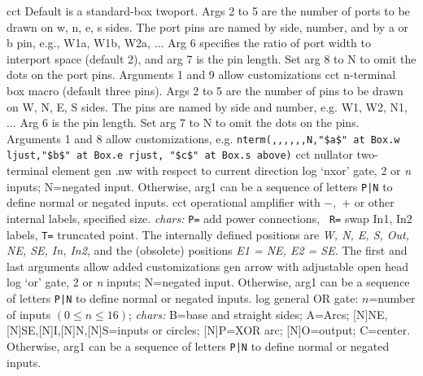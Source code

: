  {cct}
  { Default is a standard-box twoport.  Args 2 to 5 are
    the number of ports to be drawn on w, n, e, s sides.  The port pins
    are named by side, number, and by a or b pin, e.g., W1a, W1b, W2a,
    $\ldots$ Arg 6 specifies the ratio of port width to interport space
    (default 2), and arg 7 is the pin length.  Set arg 8 to N to omit
    the dots on the port pins. Arguments 1 and 9 allow customizations
   }
  {cct}
  {n-terminal box macro (default three pins).
   Args 2 to 5 are the number of pins to be drawn on W, N, E, S
   sides.  The pins are named by side and number, e.g. W1, W2, N1,
   $\ldots$ Arg 6 is the pin length.  Set arg 7 to N to omit the
   dots on the pins. Arguments 1 and 8 allow customizations, e.g.
   {\tt nterm(,{,},{,},{,}N,"\$a\$" at Box.w ljust,"\$b\$" at Box.e rjust,
      "\$c\$" at Box.s above)} }
  {cct}
  { nullator two-terminal element }
  {gen}
  {.nw with respect to current direction}
  {log}
  {`nxor' gate, 2 or {\sl n\/} inputs; N=negated input.
   Otherwise, arg1 can be a sequence of letters {\tt P|N} to define
   normal or negated inputs.
    }
%
  {cct}
  {operational amplifier with $-,$ $+$ or other internal labels,
    specified size. {\sl chars:} {\tt P=} add power connections, {\tt
    R=} swap In1, In2 labels, {\tt T=} truncated point.  The internally
    defined positions are {\sl W, N, E, S, Out, NE, SE, In, In2}, and
    the (obsolete) positions {\sl E1 = NE, E2 = SE}.  The first and last
    arguments allow added customizations
   }
  {gen}
  {arrow with adjustable open head}
  {log}
  {`or' gate, 2 or {\sl n\/} inputs; N=negated input.
   Otherwise, arg1 can be a sequence of letters {\tt P|N} to define
   normal or negated inputs.
    }
  {log}
  {general OR gate: $n$=number of inputs $(0\leq n\leq 16)$;
    {\sl chars:} B=base and straight sides; A=Arcs;
           [N]NE,[N]SE,[N]I,[N]N,[N]S=inputs or circles; [N]P=XOR arc;
           [N]O=output; C=center.
   Otherwise, arg1 can be a sequence of letters {\tt P|N} to define
   normal or negated inputs.}
